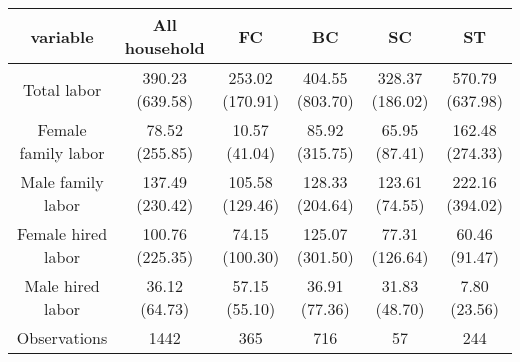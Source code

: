 \begin{table}[ht]
\centering
\begin{tabular}{cccccc}
  \hline
variable & All household & FC & BC & SC & ST \\ 
  \hline
Total labor & 390.23 (639.58) & 253.02 (170.91) & 404.55 (803.70) & 328.37 (186.02) & 570.79 (637.98) \\ 
  Female family labor & 78.52 (255.85) & 10.57 (41.04) & 85.92 (315.75) & 65.95 (87.41) & 162.48 (274.33) \\ 
  Male family labor & 137.49 (230.42) & 105.58 (129.46) & 128.33 (204.64) & 123.61 (74.55) & 222.16 (394.02) \\ 
  Female hired labor & 100.76 (225.35) & 74.15 (100.30) & 125.07 (301.50) & 77.31 (126.64) & 60.46 (91.47) \\ 
  Male hired labor & 36.12 (64.73) & 57.15 (55.10) & 36.91 (77.36) & 31.83 (48.70) & 7.80 (23.56) \\ 
  Observations & 1442 & 365 & 716 & 57 & 244 \\ 
   \hline
\end{tabular}
\end{table}
